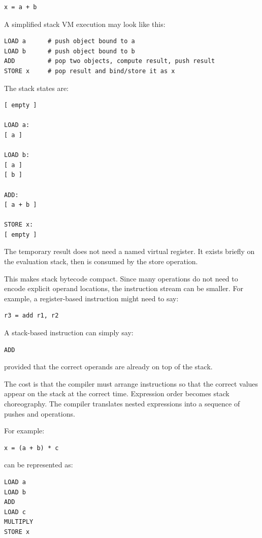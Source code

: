 \begin{verbatim}
x = a + b
\end{verbatim}

A simplified stack VM execution may look like this:

\begin{verbatim}
LOAD a      # push object bound to a
LOAD b      # push object bound to b
ADD         # pop two objects, compute result, push result
STORE x     # pop result and bind/store it as x
\end{verbatim}

The stack states are:

\begin{verbatim}
[ empty ]

LOAD a:
[ a ]

LOAD b:
[ a ]
[ b ]

ADD:
[ a + b ]

STORE x:
[ empty ]
\end{verbatim}

The temporary result does not need a named virtual register. It exists briefly on the evaluation stack, then is consumed by the store operation.

This makes stack bytecode compact. Since many operations do not need to encode explicit operand locations, the instruction stream can be smaller. For example, a register-based instruction might need to say:

\begin{verbatim}
r3 = add r1, r2
\end{verbatim}

A stack-based instruction can simply say:

\begin{verbatim}
ADD
\end{verbatim}

provided that the correct operands are already on top of the stack.

The cost is that the compiler must arrange instructions so that the correct values appear on the stack at the correct time. Expression order becomes stack choreography. The compiler translates nested expressions into a sequence of pushes and operations.

For example:

\begin{verbatim}
x = (a + b) * c
\end{verbatim}

can be represented as:

\begin{verbatim}
LOAD a
LOAD b
ADD
LOAD c
MULTIPLY
STORE x
\end{verbatim}

